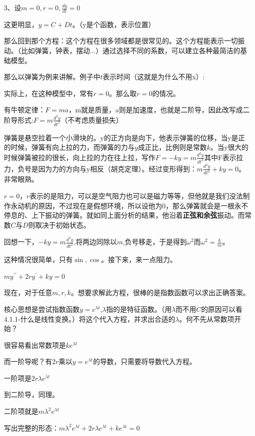 \documentclass[UTF8]{ctexbook}
\newcommand{\derivative}{^\prime}
\newcommand{\doubleDerivative}{^{\prime\prime}}
\begin{document}
{{{{3、设$m = 0, r = 0, \frac{dy}{dt} = 0$

这更明显，$y = C + Dt$。（y是个函数，表示位置）

那么回到那个方程：这个方程在很多领域都是很常见的。这个方程能表示一切振动。（比如弹簧，钟表，摆动...）通过选择不同的系数，可以建立各种最简洁的基础模型。

那么以弹簧为例来讲解。例子中$t$表示时间（这就是为什么不用x）:

实际上，在这种模型中，常有$r = 0$。那么取$ r = 0$的情况。

有牛顿定律：$F = ma$，m就是质量，a则是加速度，也就是二阶导，因此改写成二阶导形式:$F = m\frac{d^2y}{dt^2}$（不考虑质量损失）

弹簧是悬空拉着一个小滑块的。y的正方向是向下，他表示弹簧的位移，当y是正的时候，弹簧有向上拉的力，而弹簧的力与$y$成正比，比例则是常数$k$。当y很大的时候弹簧被拉的很长，向上拉的力在往上拉，写作$F = -ky = m\frac{d^2y}{dt^2}$其中F表示拉力，负号是因为力的方向与y相反（胡克定理）。经过变形得到：$m\frac{d^2y}{dt^2} + ky = 0$。非常眼熟。

$r = 0$，$r$表示的是阻力，可以是空气阻力也可以是磁力等等，但他就是我们没法制作永动机的原因，不过现在是假想环境，所以设他为0，那么弹簧就会是一根永不停息的、上下振动的弹簧。就如同上面分析的结果，他沿着{\bfseries 正弦和余弦}振动。而常数$C$与$D$则取决于初始状态。

回想一下，$-ky = m\frac{d^2y}{dt^2}$,将两边同除以$m$,负号移走，于是得到$\omega^2$而$\omega^2 = \frac{k}{m}$。

这种情况很简单，只有$\sin , \cos$。接下来，来一点阻力。

$my\doubleDerivative + 2ry\derivative + ky = 0$

现在，对于任意$m,r,k$。想要求解此方程，很棒的是指数函数可以求出正确答案。

核心思想是尝试指数函数$y = e^{\lambda t}$,$\lambda$指的是特征函数。（用$\lambda$而不用$C$的原因可以看4.1.1-什么是线性变换。）将这个代入方程，并求出合适的$\lambda$。何不先从常数项开始？

很容易看出常数项是$ke^{\lambda t}$

而一阶导呢？有$2r$乘以$y = e^{\lambda t}$的导数，只需要将导数代入方程。

一阶项是$2r\lambda e^{\lambda t}$

到二阶导，同理。

二阶项就是$m\lambda^2e^{\lambda t}$

写出完整的形态：$m\lambda^2e^{\lambda t} + 2r\lambda e^{\lambda t} + ke^{\lambda t} = 0$

}}}}
\end{document}
